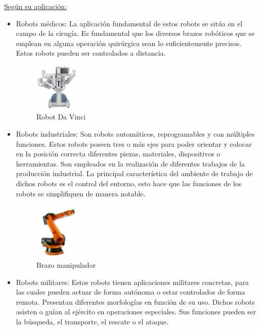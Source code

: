 \underline{Según su aplicación:} 
\begin{itemize}
\item Robots médicos: La aplicación fundamental de estos robots se sitúa en el campo de la cirugía. Es fundamental que los diversos brazos robóticos que se emplean en alguna operación quirúrgica sean lo suficientemente precisos. Estos robots pueden ser controlados a distancia.
\begin{figure}[H]
  \begin{center}
    \includegraphics[width=0.2\textwidth]{figures/Introduccion/da_vinci.png}
		\caption{Robot Da Vinci}
		\label{fig.da_vinci}
		\end{center}
\end{figure}
\item Robots industriales: Son robots automáticos, reprogramables y con múltiples funciones. Estos robots poseen tres o más ejes para poder orientar y colocar en la posición correcta diferentes piezas, materiales, dispositivos o herramientas. Son empleados en la realización de diferentes trabajos de la producción industrial. La principal característica del ambiente de trabajo de dichos robots es el control del entorno, esto hace que las funciones de los robots se simplifiquen de manera notable.  
\begin{figure}[H]
  \begin{center}
    \includegraphics[width=0.2\textwidth]{figures/Introduccion/brazo_manipulador.png}
		\caption{Brazo manipulador}
		\label{fig.brazo_manipulador}
		\end{center}
\end{figure}
\item Robots militares: Estos robots tienen aplicaciones militares concretas, para las cuales pueden actuar de forma autónoma o estar controlados de forma remota. Presentan diferentes morfologías en función de su uso. Dichos robots asisten o guían al ejército en operaciones especiales. Sus funciones pueden ser la búsqueda, el transporte, el rescate o el ataque.

\end{itemize}
